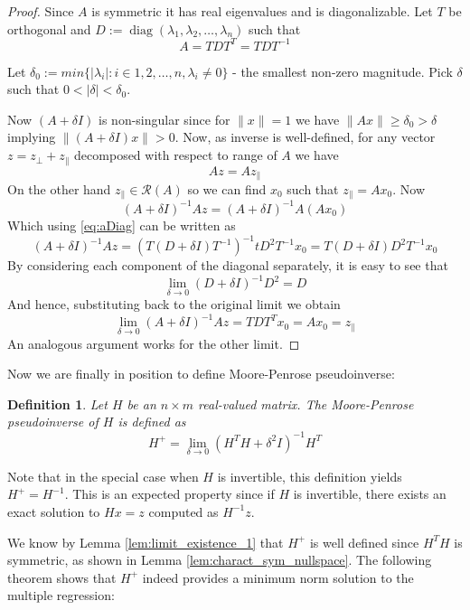 \documentclass[a4paper]{article}
\theoremstyle{break}
\newtheorem{definition}{Definition}[section]
\newcommand{\Ra}{\mathcal{R}}
\DeclareMathOperator{\diag}{diag}
\newcommand{\pll}{\parallel}
\begin{document}
\begin{proof}
    Since $A$ is symmetric it has real eigenvalues and is diagonalizable.
    Let $T$ be orthogonal and $D := \diag (\lambda_1, \lambda_2, \ldots, \lambda_n)$ such that
    \begin{equation}
    \label{eq:aDiag}
        A = T D T^T = T D T^{-1}
    \end{equation}
    
    Let $ \delta_0 := min\{ | \lambda_i | : i \in {1, 2, \ldots, n}, \lambda_i \neq 0 \}$ - the smallest non-zero magnitude.
    Pick $ \delta$ such that $ 0 <  | \delta | < \delta_0$.
    
    Now $(A + \delta I)$ is non-singular since for $ \| x \| = 1$ we have $ \| A x \| \geq \delta_0 > \delta$
    implying $ \| (A + \delta I) x \| > 0 $.
    Now, as inverse is well-defined, for any vector $z = z_\perp + z_\pll$ decomposed with respect to range of $A$ we have
    $$ A z = A z_\pll$$
    On the other hand $z_\pll \in \Ra(A)$ so we can find $x_0$ such that $ z_\pll = A x_0$. Now
    $$ (A + \delta I)^{-1} A z = (A + \delta I)^{-1} A (A x_0) $$
    Which using \eqref{eq:aDiag} can be written as
    $$ (A + \delta I)^{-1} A z =
    (T(D + \delta I) T^{-1})^{-1} t D^2 T^{-1} x_0 =
    T (D + \delta I) D^2 T^{-1} x_0
    $$
    By considering each component of the diagonal separately, it is easy to see that
    $$ \lim_{\delta \to 0} (D + \delta I)^{-1} D^2 = D $$
    And hence, substituting back to the original limit we obtain
    $$ \lim_{\delta \to 0} ( A + \delta I) ^{-1} A z = T D T^T x_0 = A x_0 = z_\pll $$
    An analogous argument works for the other limit.
\end{proof}

Now we are finally in position to define Moore-Penrose pseudoinverse:

\begin{definition}
    Let $H$ be an $ n \times m $ real-valued matrix.
    The Moore-Penrose pseudoinverse of $H$ is defined as
    $$ H^+ = \lim_{\delta \to 0} ( H^T H + \delta^2 I) ^{-1} H^T $$
\end{definition}

Note that in the special case when $H$ is invertible, this definition yields $H^+ = H^{-1}$. This is an expected property since if $H$ is invertible, there exists an exact solution to $ H x = z $ computed as $ H^{-1} z$.

We know by Lemma \ref{lem:limit_existence_1} that $H^+$ is well defined since $H^T H$ is symmetric, as shown in Lemma \ref{lem:charact_sym_nullspace}. The following theorem shows that $ H^+$ indeed provides a minimum norm solution to the multiple regression:
\end{document}

